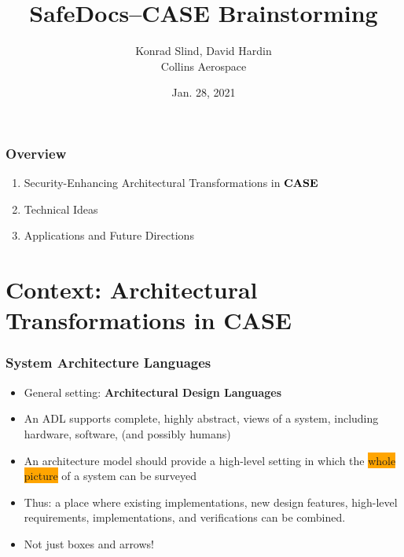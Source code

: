\documentclass{beamer}
\newcommand{\kemph}[1]{\colorbox{orange}{#1}}
\newcommand{\konst}[1]{\ensuremath{\mbox{\bf{#1}}}}
\begin{document}

\author{Konrad Slind, David Hardin \\ Collins Aerospace}
\date{Jan. 28, 2021}
\title{SafeDocs--CASE Brainstorming}
\maketitle

\begin{frame}\frametitle{Overview}

\begin{enumerate}
\item Security-Enhancing Architectural Transformations in \konst{CASE}
\item Technical Ideas
\item Applications and Future Directions
\end{enumerate}
\end{frame}


\section {Context: Architectural Transformations in CASE}

\begin{frame}\frametitle{System Architecture Languages}
\begin{itemize}

\item General setting: \textbf{Architectural Design Languages}

\item An ADL supports complete, highly abstract, views of a system,
  including hardware, software, (and possibly humans)

\item An architecture model should provide a high-level setting in which
  the \kemph{whole picture} of a system can be surveyed

\item Thus: a place where existing implementations, new design
  features, high-level requirements, implementations, and
  verifications can be combined.

\item Not just boxes and arrows!

\end{itemize}

\end{frame}
\end{document}
